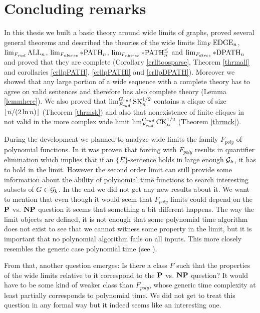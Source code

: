 \chapter*{Concluding remarks}

In this thesis we built a basic theory around wide limits of graphs, proved several general theorems and described the theories of the wide limits $\lim_F\EDGE_n$, $\lim_{F_{rud}}\ALL_n$, $\lim_{F_{nbtree}}\pPATH_n$, $\lim_{F_{nbtree}}\pPATHl_n$ and $\lim_{F_{dtree}}\pDPATH_n$ and proved that they are complete (Corollary \ref{crlltoosparse}, Theorem \ref{thrmall} and corollaries \ref{crllpPATH}, \ref{crllpPATHl} and \ref{crllpDPATH}). Moreover we showed that any large portion of a wide sequence with a complete theory has to agree on valid sentences and therefore has also complete theory (Lemma \ref{lemmhere}). We also proved that $\lim_{F_{rud}}^{G_{rud}}\SK_n^{1/2}$ contains a clique of size $\floor{n/(2\ln n)}$ (Theorem \ref{thrmsk}) and also that nonexistence of finite cliques in not valid in the more complex wide limit $\lim_{F_{rud}}^{G_{rud}}\CK_n^{1/2}$ (Theorem \ref{thrmck}).

During the development we planned to analyze wide limits the family $F_{poly}$ of polynomial functions. In \cite{krajicek2010forcing} it was proven that forcing with $F_{poly}$ results in quantifier elimination which implies that if an $\{E\}$-sentence holds in large enough $\G_k$, it has to hold in the limit. However the second order limit can still provide some information about the ability of polynomial time functions to search interesting subsets of $G\in\G_k$. In the end we did not get any new results about it. We want to mention that even though it would seem that $F_{poly}$ limits could depend on the $\P$ vs. $\NP$ question it seems that something a bit different happens. The way the limit objects are defined, it is not enough that some polynomial time algorithm does not exist to see that we cannot witness some property in the limit, but it is important that no polynomial algorithm fails on all inputs. This more closely resembles the generic case polynomial time (see \cite{gilman2007report}).

From that, another question emerges: Is there a class $F$ such that the properties of the wide limits relative to it correspond to the $\P$ vs. $\NP$ question? It would have to be some kind of weaker class than $F_{poly}$, whose generic time complexity at least partially corresponds to polynomial time. We did not get to treat this question in any formal way but it indeed seems like an interesting one.

